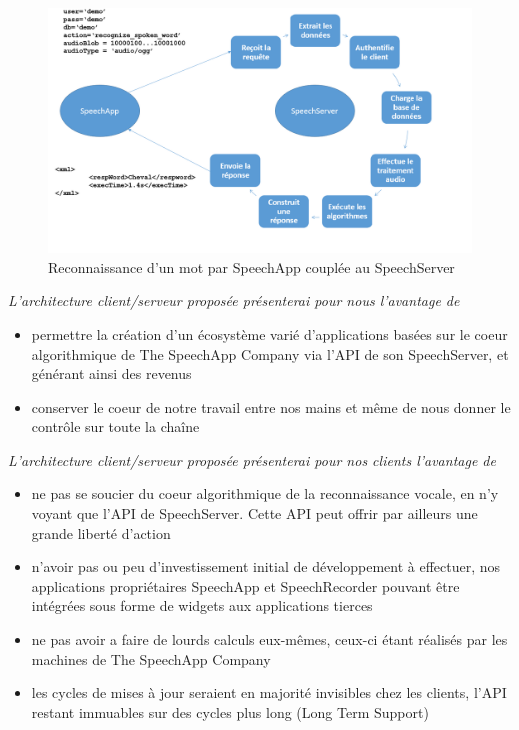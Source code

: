 \documentclass[a4paper,12pt]{report}
\begin{document}
\begin{figure}
	\begin{center}
	\includegraphics[width=14cm]{pics/vieRequete.png} 
	\end{center}
	\caption{Reconnaissance d'un mot par SpeechApp couplée au SpeechServer}
\end{figure}

\emph{L'architecture client/serveur proposée présenterai pour nous l'avantage de}
\begin{itemize}
	\item{permettre la création d'un écosystème varié d'applications basées sur le coeur algorithmique de The SpeechApp Company via l'API de son SpeechServer, et générant ainsi des revenus}
	\item{conserver le coeur de notre travail entre nos mains et même de nous donner le contrôle sur toute la chaîne}
\end{itemize}

\medskip{}

\emph{L'architecture client/serveur proposée présenterai pour nos clients l'avantage de}
\begin{itemize}
	\item{ne pas se soucier du coeur algorithmique de la reconnaissance vocale, en n'y voyant que l'API de SpeechServer. Cette API peut offrir par ailleurs une grande liberté d'action}
	\item{n'avoir pas ou peu d'investissement initial de développement à effectuer, nos applications propriétaires SpeechApp et SpeechRecorder pouvant être intégrées sous forme de widgets aux applications tierces}
	\item{ne pas avoir a faire de lourds calculs eux-mêmes, ceux-ci étant réalisés par les machines de The SpeechApp Company}
	\item{les cycles de mises à jour seraient en majorité invisibles chez les clients, l'API restant immuables sur des cycles plus long (Long Term Support)}
\end{itemize}
\end{document}
